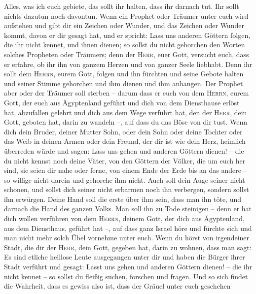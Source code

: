  Alles, was ich euch gebiete, das sollt ihr halten, dass
ihr darnach tut. Ihr sollt nichts dazutun noch davontun. 
Wenn ein Prophet oder Träumer unter euch wird aufstehen und gibt dir ein
Zeichen oder Wunder,  und das Zeichen oder Wunder kommt,
davon er dir gesagt hat, und er spricht: Lass uns anderen Göttern
folgen, die ihr nicht kennet, und ihnen dienen;  so sollst
du nicht gehorchen den Worten solches Propheten oder Träumers; denn der
\textsc{Herr}, euer Gott, versucht euch, dass er erfahre, ob ihr ihn von
ganzem Herzen und von ganzer Seele liebhabt.  Denn ihr
sollt dem \textsc{Herrn}, eurem Gott, folgen und ihn fürchten und seine
Gebote halten und seiner Stimme gehorchen und ihm dienen und ihm
anhangen.  Der Prophet aber oder der Träumer soll sterben
-- darum dass er euch von dem \textsc{Herrn}, eurem Gott, der euch aus
Ägyptenland geführt und dich von dem Diensthause erlöst hat, abzufallen
gelehrt und dich aus dem Wege verführt hat, den der \textsc{Herr}, dein
Gott, geboten hat, darin zu wandeln --, auf dass du das Böse von dir
tust.  Wenn dich dein Bruder, deiner Mutter Sohn, oder
dein Sohn oder deine Tochter oder das Weib in deinen Armen oder dein
Freund, der dir ist wie dein Herz, heimlich überreden würde und sagen:
Lass uns gehen und anderen Göttern dienen! -- die du nicht kennst noch
deine Väter,  von den Göttern der Völker, die um euch her
sind, sie seien dir nahe oder ferne, von einem Ende der Erde bis an das
andere --  so willige nicht darein und gehorche ihm nicht.
Auch soll dein Auge seiner nicht schonen, und sollst dich seiner nicht
erbarmen noch ihn verbergen,  sondern sollst ihn
erwürgen. Deine Hand soll die erste über ihm sein, dass man ihn töte,
und darnach die Hand des ganzen Volks.  Man soll ihn zu
Tode steinigen -- denn er hat dich wollen verführen von dem
\textsc{Herrn}, deinem Gott, der dich aus Ägyptenland, aus dem
Diensthaus, geführt hat --,  auf dass ganz Israel höre
und fürchte sich und man nicht mehr solch Übel vornehme unter euch.
 Wenn du hörst von irgendeiner Stadt, die dir der
\textsc{Herr}, dein Gott, gegeben hat, darin zu wohnen, dass man sagt:
 Es sind etliche heillose Leute ausgegangen unter dir und
haben die Bürger ihrer Stadt verführt und gesagt: Lasst uns gehen und
anderen Göttern dienen! -- die ihr nicht kennet --  so
sollst du fleißig suchen, forschen und fragen. Und so sich findet die
Wahrheit, dass es gewiss also ist, dass der Gräuel unter euch geschehen
